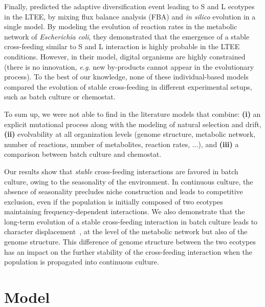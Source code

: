 Finally, \cite{grosskopf-et-al-2016} predicted the adaptive diversification event leading to S and L ecotypes in the LTEE, by mixing flux balance analysis (FBA) and \textit{in silico} evolution in a single model. By modeling the evolution of reaction rates in the metabolic network of \textit{Escherichia coli}, they demonstrated that the emergence of a stable cross-feeding similar to S and L interaction is highly probable in the LTEE conditions. However, in their model, digital organisms are highly constrained (there is no innovation, \textit{e.g.} new by-products cannot appear in the evolutionary process).
To the best of our knowledge, none of these individual-based models compared the evolution of stable cross-feeding in different experimental setups, such as batch culture or chemostat.

To sum up, we were not able to find in the literature models that combine: {\bf (i)} an explicit mutational process along with the modeling of natural selection and drift, {\bf (ii)} evolvability at all organization levels (genome structure, metabolic network, number of reactions, number of metabolites, reaction rates, ...), and {\bf (iii)} a comparison between batch culture and chemostat.

Our results show that \textit{stable} cross-feeding interactions are favored in batch culture, owing to the seasonality of the environment. In continuous culture, the absence of seasonality precludes niche construction and leads to competitive exclusion, even if the population is initially composed of two ecotypes maintaining frequency-dependent interactions.
We also demonstrate that the long-term evolution of a stable cross-feeding interaction in batch culture leads to character displacement~\citep{legac-et-al-2012,grosskopf-et-al-2016}, at the level of the metabolic network but also of the genome structure. This difference of genome structure between the two ecotypes has an impact on the further stability of the cross-feeding interaction when the population is propagated into continuous culture.


\section{Model}

